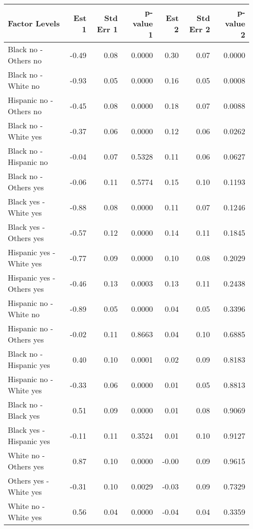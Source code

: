 \documentclass[11pt]{extarticle} %
\begin{document}
\begin{table}[ht]
\footnotesize
\centering
\begin{tabular}{lrrrrrr}
  \hline
Factor Levels & Est 1 & Std Err 1 & p-value 1 & Est 2 & Std Err 2 & p-value 2 \\ 
  \hline
  Black no -  Others no & -0.49 & 0.08 & 0.0000 & 0.30 & 0.07 & 0.0000 \\ 
    Black no -  White no & -0.93 & 0.05 & 0.0000 & 0.16 & 0.05 & 0.0008 \\ 
    Hispanic no -  Others no & -0.45 & 0.08 & 0.0000 & 0.18 & 0.07 & 0.0088 \\ 
    Black no -  White yes & -0.37 & 0.06 & 0.0000 & 0.12 & 0.06 & 0.0262 \\ 
    Black no -  Hispanic no & -0.04 & 0.07 & 0.5328 & 0.11 & 0.06 & 0.0627 \\ 
    Black no -  Others yes & -0.06 & 0.11 & 0.5774 & 0.15 & 0.10 & 0.1193 \\ 
    Black yes -  White yes & -0.88 & 0.08 & 0.0000 & 0.11 & 0.07 & 0.1246 \\ 
    Black yes -  Others yes & -0.57 & 0.12 & 0.0000 & 0.14 & 0.11 & 0.1845 \\ 
    Hispanic yes -  White yes & -0.77 & 0.09 & 0.0000 & 0.10 & 0.08 & 0.2029 \\ 
    Hispanic yes -  Others yes & -0.46 & 0.13 & 0.0003 & 0.13 & 0.11 & 0.2438 \\ 
    Hispanic no -  White no & -0.89 & 0.05 & 0.0000 & 0.04 & 0.05 & 0.3396 \\ 
    Hispanic no -  Others yes & -0.02 & 0.11 & 0.8663 & 0.04 & 0.10 & 0.6885 \\ 
    Black no -  Hispanic yes & 0.40 & 0.10 & 0.0001 & 0.02 & 0.09 & 0.8183 \\ 
    Hispanic no -  White yes & -0.33 & 0.06 & 0.0000 & 0.01 & 0.05 & 0.8813 \\ 
    Black no -  Black yes & 0.51 & 0.09 & 0.0000 & 0.01 & 0.08 & 0.9069 \\ 
    Black yes -  Hispanic yes & -0.11 & 0.11 & 0.3524 & 0.01 & 0.10 & 0.9127 \\ 
    White no -  Others yes & 0.87 & 0.10 & 0.0000 & -0.00 & 0.09 & 0.9615 \\ 
    Others yes -  White yes & -0.31 & 0.10 & 0.0029 & -0.03 & 0.09 & 0.7329 \\ 
    White no -  White yes & 0.56 & 0.04 & 0.0000 & -0.04 & 0.04 & 0.3359 \\ 

\end{tabular}
\end{table}
\end{document}
